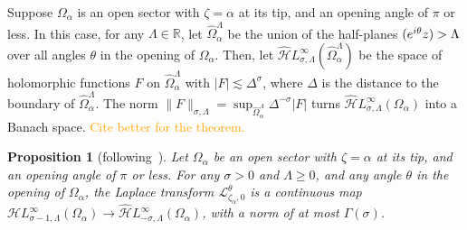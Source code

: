 \documentclass{article}
\let\Re\relax
\DeclareMathOperator{\Re}{Re}
\newcommand{\singexp}[2]{\mathcal{H}L^\infty_{#1, #2}}
\newcommand{\dualsingexp}[2]{\widehat{\mathcal{H}}L^\infty_{#1, #2}}
\newcommand{\R}{\mathbb{R}}
\newcommand{\laplace}{\mathcal{L}}
\theoremstyle{definition}
\theoremstyle{plain}
\newtheorem{prop}[definition]{Proposition}
\begin{document}
\color{NavyBlue}
Suppose $\Omega_\alpha$ is an open sector with $\zeta = \alpha$ at its tip, and an opening angle of $\pi$ or less. In this case, for any $\Lambda \in \R$, let $\widehat{\Omega}_\alpha^\Lambda$ be the union of the half-planes $\Re(e^{i\theta} z) > \Lambda$ over all angles $\theta$ in the opening of $\Omega_\alpha$. Then, let $\dualsingexp{\sigma}{\Lambda}(\widehat{\Omega}_\alpha^\Lambda)$ be the space of holomorphic functions $F$ on $\widehat{\Omega}_\alpha^\Lambda$ with $|F| \lesssim \Delta^\sigma$, where $\Delta$ is the distance to the boundary of $\widehat{\Omega}_\alpha^\Lambda$. The norm $\|F\|_{\sigma, \Lambda} = \sup_{\widehat{\Omega}_\alpha^\Lambda} \Delta^{-\sigma} |F|$ turns $\dualsingexp{\sigma}{\Lambda}(\Omega_\alpha)$ into a Banach space. \textcolor{orange}{Cite \cite{sternin1995borel} better for the theorem.}
\begin{prop}[following~\cite{sternin1995borel}]\label{prop:laplace-cont}
Let $\Omega_\alpha$ be an open sector with $\zeta = \alpha$ at its tip, and an opening angle of $\pi$ or less. For any $\sigma > 0$ and $\Lambda \ge 0$, and any angle $\theta$ in the opening of $\Omega_\alpha$, the Laplace transform $\laplace_{\zeta_\alpha, 0}^\theta$ is a continuous map $\singexp{\sigma-1}{\Lambda}(\Omega_\alpha) \to \dualsingexp{-\sigma}{\Lambda}(\Omega_\alpha)$, with a norm of at most $\Gamma(\sigma)$.
\end{prop}
\end{document}
